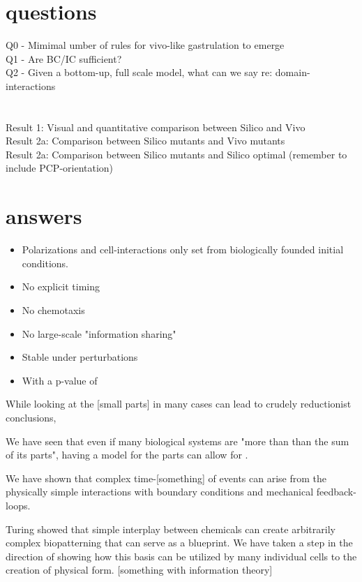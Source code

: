 \section{questions}

Q0 - Mimimal umber of rules for vivo-like gastrulation to emerge\\
Q1 - Are BC/IC sufficient?\\
Q2 - Given a bottom-up, full scale model, what can we say re: domain-interactions\\
\\\\
Result 1: Visual and quantitative comparison between Silico and Vivo\\
Result 2a: Comparison between Silico mutants and Vivo mutants\\
Result 2a: Comparison between Silico mutants and Silico optimal (remember to include PCP-orientation)\\

\section{answers}
\begin{itemize}
    \item Polarizations and cell-interactions only set from biologically founded initial conditions.
    \item No explicit timing
    \item No chemotaxis
    \item No large-scale "information sharing"
    \item Stable under perturbations
    \item With a p-value of 
\end{itemize}

While looking at the [small parts] in many cases can lead to crudely reductionist conclusions, 

We have seen that even if many biological systems are "more than than the sum of its parts", having a model for the parts can allow for .

We have shown that complex time-[something] of events can arise from the physically simple interactions with boundary conditions and mechanical feedback-loops.

Turing showed that simple interplay between chemicals can create arbitrarily complex biopatterning that can serve as a blueprint. We have taken a step in the direction of showing how this basis can be utilized by many individual cells to the creation of physical form.  [something with information theory] 


